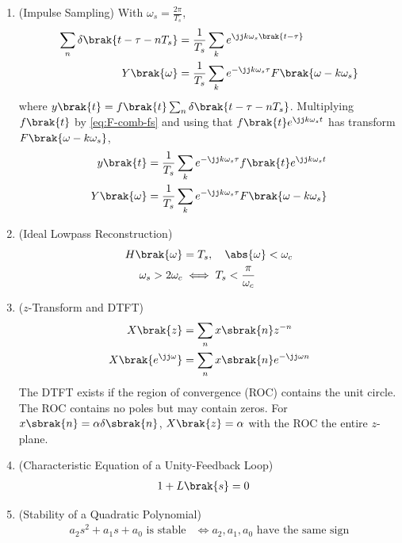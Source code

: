 \begin{enumerate}[label=\thesubsection.\arabic*, ref=\thesubsection.\theenumi, itemsep=0pt, leftmargin=0pt, labelwidth=0pt, itemindent=0pt, labelsep=1em, align=right]
\item (Impulse Sampling) With $\omega_s = \frac{2\pi}{T_s}$,
\begin{align}
\sum_{n} \delta\brak{t - \tau - n T_s} &= \frac{1}{T_s} \sum_{k} e^{\jj k \omega_s \brak{t - \tau}}
\label{eq:F-comb-fs}
\\
Y\brak{\omega} &= \frac{1}{T_s} \sum_{k} e^{-\jj k \omega_s \tau} F\brak{\omega - k \omega_s}
\label{eq:F-sampled}
\end{align}
where $y\brak{t} = f\brak{t} \sum_{n} \delta\brak{t - \tau - n T_s}$.
\solution Multiplying $f\brak{t}$ by \eqref{eq:F-comb-fs} and using that $f\brak{t}e^{\jj k \omega_s t}$ has transform $F\brak{\omega - k\omega_s}$,
\begin{align}
y\brak{t} &= \frac{1}{T_s} \sum_{k} e^{-\jj k \omega_s \tau} f\brak{t} e^{\jj k \omega_s t}
\\
Y\brak{\omega} &= \frac{1}{T_s} \sum_{k} e^{-\jj k \omega_s \tau} F\brak{\omega - k \omega_s}
\end{align}

\item (Ideal Lowpass Reconstruction)
\begin{align}
H\brak{\omega} &= T_s, \quad \abs{\omega} < \omega_c
\label{eq:F-lpf}
\\
\omega_s > 2\omega_c &\iff T_s < \frac{\pi}{\omega_c}
\label{eq:F-nyquist}
\end{align}

\item ($z$-Transform and DTFT)
\begin{align}
X\brak{z} &= \sum_{n} x\sbrak{n} z^{-n}
\\
X\brak{e^{\jj \omega}} &= \sum_{n} x\sbrak{n} e^{-\jj \omega n}
\label{eq:F-ztrans}
\end{align}
The DTFT exists if the region of convergence (ROC) contains the unit circle. The ROC contains no poles but may contain zeros. For $x\sbrak{n} = \alpha \delta\sbrak{n}$, $X\brak{z} = \alpha$ with the ROC the entire $z$-plane.

\item (Characteristic Equation of a Unity-Feedback Loop)
\begin{align}
1 + L\brak{s} &= 0
\label{eq:F-char}
\end{align}

\item (Stability of a Quadratic Polynomial)
\begin{align}
a_2 s^2 + a_1 s + a_0 \text{ is stable} &\iff a_2, a_1, a_0 \text{ have the same sign}
\label{eq:F-hurwitz2}
\end{align}


\end{enumerate}
